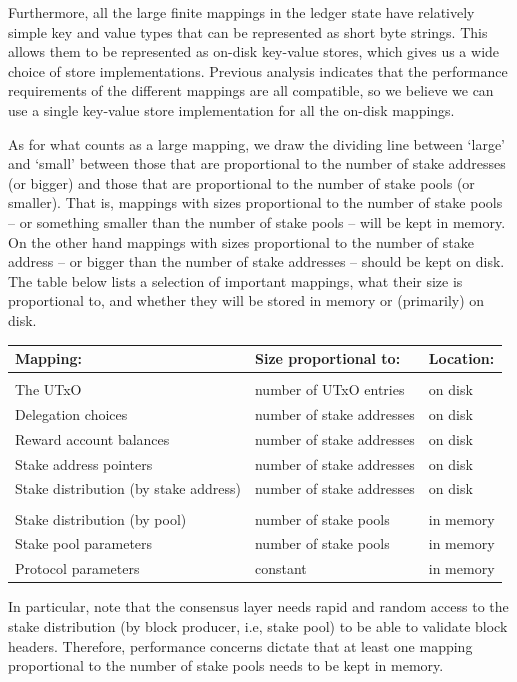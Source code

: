 \documentclass[11pt,a4paper]{article}
\begin{document}
Furthermore, all the large finite mappings in the ledger state have relatively
simple key and value types that can be represented as short byte strings. This
allows them to be represented as on-disk key-value stores, which gives us a
wide choice of store implementations. Previous analysis \citep[Section 5]{utxo-db}
indicates that the performance requirements of the different mappings are all
compatible, so we believe we can use a single key-value store implementation
for all the on-disk mappings.

As for what counts as a large mapping, we draw the dividing line between `large'
and `small' between those that are proportional to the number of stake addresses
(or bigger) and those that are proportional to the number of stake pools (or
smaller). That is, mappings with sizes proportional to the number of stake pools
-- or something smaller than the number of stake pools -- will be kept in
memory. On the other hand mappings with sizes proportional to the number of
stake address -- or bigger than the number of stake addresses -- should be kept
on disk. The table below lists a selection of important mappings, what their
size is proportional to, and whether they will be stored in memory or
(primarily) on disk.
\begin{center}
\begin{tabular}{lll}
Mapping: & Size proportional to: & Location: \\
\hline \hline \\
The UTxO                              & number of UTxO entries    & on disk \\
Delegation choices                    & number of stake addresses & on disk \\
Reward account balances               & number of stake addresses & on disk \\
Stake address pointers                & number of stake addresses & on disk \\
Stake distribution (by stake address) & number of stake addresses & on disk \\
\hline \\
Stake distribution (by pool)          & number of stake pools & in memory \\
Stake pool parameters                 & number of stake pools & in memory \\
Protocol parameters                   & constant              & in memory
\end{tabular}
\end{center}
In particular, note that the consensus layer needs rapid and random access to
the stake distribution (by block producer, i.e, stake pool) to be able to
validate block headers. Therefore, performance concerns dictate that at least
one mapping proportional to the number of stake pools needs to be kept in
memory.
\end{document}

